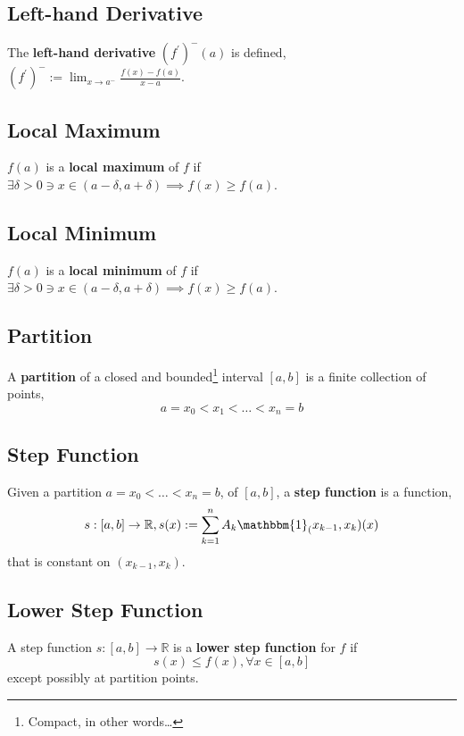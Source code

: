 \documentclass[11pt]{book}
\newcommand{\R}{\mathbb{R}}
\begin{document}
	\subsection{Left-hand Derivative}
	\label{subsec:lhderivative}
	\begin{defin}
		The \textbf{left-hand derivative} $(f^{\prime})^-(a)$ is defined, $(f^{\prime})^- := \displaystyle\lim_{x \to a^-}{\frac{f(x) - f(a)}{x - a}}$.
	\end{defin}
	\subsection{Local Maximum}
	\label{subsec:localmaximum}
		\begin{defin}
			$f(a)$ is a \textbf{local maximum} of $f$ if $\exists \delta > 0 \ni x \in (a-\delta,a+\delta) \implies f(x) \geq f(a)$.
		\end{defin}
	\subsection{Local Minimum}
	\label{subsec:locaminimum}
		\begin{defin}
			$f(a)$ is a \textbf{local minimum} of $f$ if $\exists \delta > 0 \ni x \in (a-\delta,a+\delta) \implies f(x) \geq f(a)$.
		\end{defin}
	\subsection{Partition}
	\label{subsec:partition}
		\begin{defin}
			A \textbf{partition} of a closed and bounded\footnote{Compact, in other words\dots} interval $[a,b]$ is a finite collection of points,
			$$a = x_0 < x_1 < \dots < x_n = b$$
		\end{defin}

	\subsection{Step Function}
	\label{subsec:stepfunction}
		\begin{defin}
			Given a partition $a = x_0 < \dots < x_n = b$, of $[a,b]$, a \textbf{step function} is a function,
			$$s:[a,b] \to \R, s(x) := \sum_{k = 1}^n{A_k \mathbbm{1}_(x_{k-1},x_k)(x)}$$
			that is constant on $(x_{k-1},x_k)$.
		\end{defin}

	\subsection{Lower Step Function}
	\label{subsec:lowerstepfunction}
		\begin{defin}
			A step function $s:[a,b] \to \R$ is a \textbf{lower step function} for $f$ if 
			$$s(x) \leq f(x), \forall x \in [a,b]$$
			except possibly at partition points.
		\end{defin}
\end{document}
